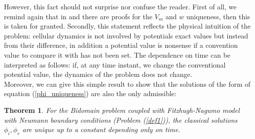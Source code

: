 \documentclass[a4paper,11pt]{article}
\newtheorem{theo}{Theorem}
\begin{document}
\vspace{4mm}
\noindent However, this fact should not surprise nor confuse the reader. First of all, we remind again that in \cite{bourgault} and \cite{colli_franzone} there are proofs for the $V_m$ and $w$ uniqueness, then this is taken for granted. Secondly, this statement reflects the physical intuition of the problem: cellular dynamics is not involved by potentials exact values but instead from their difference, in addition a potential value is nonsense if a convention value to compare it with has not been set. The dependence on time can be interpreted as follows: if, at any time instant, we change the conventional potential value, the dynamics of the problem does not change. \\

\noindent Moreover, we can give this simple result to show that the solutions of the form of equation (\ref{phi_uniqueness}) are also the only admissible:\\
\begin{theo}
	For the Bidomain problem coupled with Fitzhugh-Nagumo model with Neumann boundary conditions (Problem (\ref{def1})), the classical solutions $\phi_i,\phi_e$ are unique up to a constant depending only on time. 
\end{theo}
\end{document}
